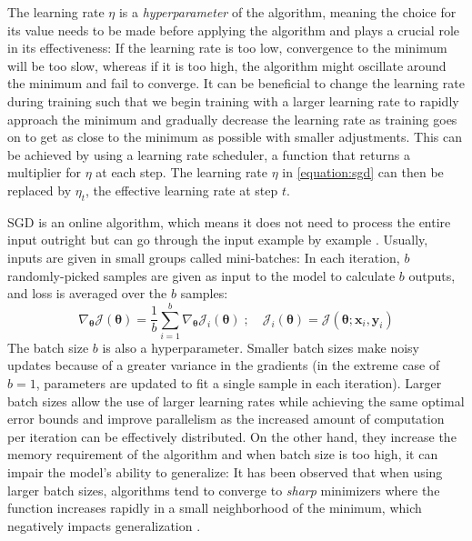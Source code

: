 The learning rate $\eta$ is a \textit{hyperparameter}
of the algorithm, meaning the choice for its value needs
to be made before applying the algorithm and plays a 
crucial role in its effectiveness: 
If the learning rate is too low, convergence to the minimum
will be too slow, whereas if it is too high, the algorithm 
might oscillate around the minimum and fail to converge. 
It can be beneficial to change the learning rate during
training such that we begin training with a larger 
learning rate to rapidly approach the minimum and 
gradually decrease the learning rate as training goes on 
to get as close to the 
minimum as possible with smaller adjustments. This can be 
achieved by using a learning rate scheduler, a function 
that returns a multiplier for $\eta$ at each step. 
The learning rate $\eta$ in \autoref{equation:sgd} can 
then be replaced by $\eta_t$, the effective learning rate
at step $t$.

\ac{SGD} is an online algorithm, which means it does not
need to process the entire input outright but can go 
through the input example by example 
\parencite[Chapter 5]{jurafsky}. Usually, inputs are
given in small groups called mini-batches:
In each iteration, $b$ randomly-picked samples are given as
input to the model to calculate $b$ outputs, and 
loss is averaged over the $b$ samples:
\begin{equation}
    \nabla_{\bm{\theta}} \mathcal{J}(\bm{\theta}) = 
    \frac{1}{b}\sum_{i=1}^{b}
    \nabla_{\bm{\theta}} \mathcal{J}_i(\bm{\theta})
    \;;\quad
    \mathcal{J}_i(\bm{\theta}) = \mathcal{J}(\bm{\theta}; \mathbf{x}_i, \mathbf{y}_i)
\end{equation} 
The batch size $b$ is also a hyperparameter. Smaller
batch sizes make noisy updates because of a greater 
variance in the gradients
(in the extreme case of $b=1$, parameters are updated to fit a 
single sample in each iteration). 
Larger batch sizes allow the use of larger 
learning rates while achieving the same optimal 
error bounds \parencite{minibatch} and improve
parallelism as the increased amount of computation per 
iteration can be effectively distributed. On the other hand,
they increase the memory requirement of the algorithm and  
when batch size is too high, it can 
impair the model's ability to generalize:
It has been observed that 
when using larger batch sizes, 
algorithms tend to converge 
to \textit{sharp} minimizers where the  
function increases rapidly in a small neighborhood of 
the minimum, which negatively impacts generalization 
\parencite{minibatch2}.  

